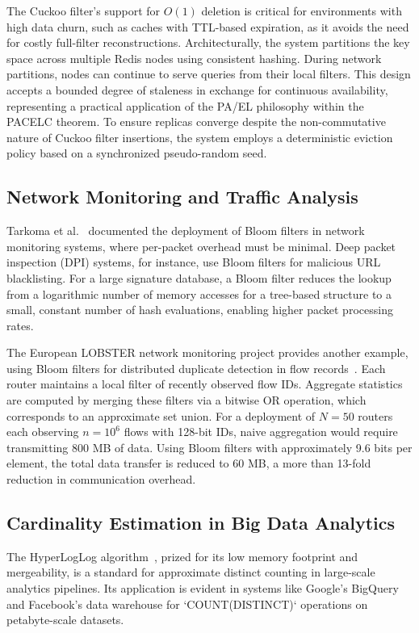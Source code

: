 The Cuckoo filter's support for $O(1)$ deletion is critical for environments with high data churn, such as caches with TTL-based expiration, as it avoids the need for costly full-filter reconstructions. Architecturally, the system partitions the key space across multiple Redis nodes using consistent hashing. During network partitions, nodes can continue to serve queries from their local filters. This design accepts a bounded degree of staleness in exchange for continuous availability, representing a practical application of the PA/EL philosophy within the PACELC theorem. To ensure replicas converge despite the non-commutative nature of Cuckoo filter insertions, the system employs a deterministic eviction policy based on a synchronized pseudo-random seed.

\subsection{Network Monitoring and Traffic Analysis}

Tarkoma et al.~\cite{tarkoma2011theory} documented the deployment of Bloom filters in network monitoring systems, where per-packet overhead must be minimal. Deep packet inspection (DPI) systems, for instance, use Bloom filters for malicious URL blacklisting. For a large signature database, a Bloom filter reduces the lookup from a logarithmic number of memory accesses for a tree-based structure to a small, constant number of hash evaluations, enabling higher packet processing rates.

The European LOBSTER network monitoring project provides another example, using Bloom filters for distributed duplicate detection in flow records~\cite{tarkoma2011theory}. Each router maintains a local filter of recently observed flow IDs. Aggregate statistics are computed by merging these filters via a bitwise OR operation, which corresponds to an approximate set union. For a deployment of $N = 50$ routers each observing $n = 10^6$ flows with 128-bit IDs, naive aggregation would require transmitting 800 MB of data. Using Bloom filters with approximately 9.6 bits per element, the total data transfer is reduced to 60 MB, a more than 13-fold reduction in communication overhead.

\subsection{Cardinality Estimation in Big Data Analytics}

The HyperLogLog algorithm~\cite{flajolet2007hyperloglog}, prized for its low memory footprint and mergeability, is a standard for approximate distinct counting in large-scale analytics pipelines. Its application is evident in systems like Google's BigQuery and Facebook's data warehouse for `COUNT(DISTINCT)` operations on petabyte-scale datasets.

